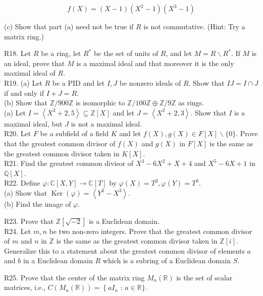$$
f(X)=(X-1)\left(X^{2}-1\right)\left(X^{3}-1\right)
$$

(c) Show that part (a) need not be true if $R$ is not commutative. (Hint: Try a matrix ring.)

R18. Let $R$ be a ring, let $R^{*}$ be the set of units of $R$, and let $M=R \backslash R^{*}$. If $M$ is an ideal, prove that $M$ is a maximal ideal and that moreover it is the only maximal ideal of $R$.\\
R19. (a) Let $R$ be a PID and let $I, J$ be nonzero ideals of $R$. Show that $I J=I \cap J$ if and only if $I+J=R$.\\
(b) Show that $\mathbb{Z} / 900 \mathbb{Z}$ is isomorphic to $\mathbb{Z} / 100 \mathbb{Z} \oplus \mathbb{Z} / 9 \mathbb{Z}$ as rings.\\
(a) Let $I=\left\langle X^{2}+2,5\right\rangle \subseteq \mathbb{Z}[X]$ and let $J=\left\langle X^{2}+2,3\right\rangle$. Show that $I$ is a maximal ideal, but $J$ is not a maximal ideal.\\
R20. Let $F$ be a subfield of a field $K$ and let $f(X), g(X) \in F[X] \backslash\{0\}$. Prove that the greatest common divisor of $f(X)$ and $g(X)$ in $F[X]$ is the same as the greatest common divisor taken in $K[X]$.\\
R21. Find the greatest common divisor of $X^{3}-6 X^{2}+X+4$ and $X^{5}-6 X+1$ in $\mathbb{Q}[X]$.\\
R22. Define $\varphi: \mathbb{C}[X, Y] \rightarrow \mathbb{C}[T]$ by $\varphi(X)=T^{2}, \varphi(Y)=T^{3}$.\\
(a) Show that $\operatorname{Ker}(\varphi)=\left\langle Y^{2}-X^{3}\right\rangle$.\\
(b) Find the image of $\varphi$.

R23. Prove that $\mathbb{Z}[\sqrt{-2}]$ is a Euclidean domain.\\
R24. Let $m, n$ be two non-zero integers. Prove that the greatest common divisor of $m$ and $n$ in $\mathbb{Z}$ is the same as the greatest common divisor taken in $\mathbb{Z}[i]$. Generalize this to a statement about the greatest common divisor of elements $a$ and $b$ in a Euclidean domain $R$ which is a subring of a Euclidean domain $S$.

R25. Prove that the center of the matrix ring $M_{n}(\mathbb{R})$ is the set of scalar matrices, i.e., $C\left(M_{n}(\mathbb{R})\right)=\left\{a I_{n}\right.$ : $a \in \mathbb{R}\}$.

